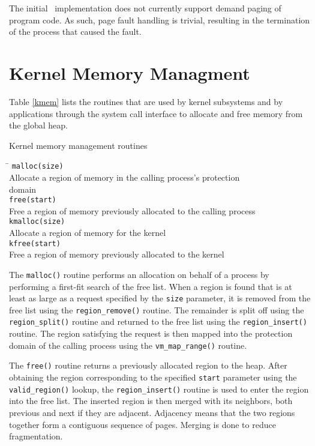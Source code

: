 The initial \roadrunner\  implementation does not
currently support demand paging of program code.  As
such, page fault handling is trivial, resulting in the
termination of the process that caused the fault.


\section{Kernel Memory Managment}

Table \ref{kmem} lists the routines that are used by
kernel subsystems and by applications through the system
call interface to allocate and free memory from the
global heap.

\begin{table}[h]
\caption{\label{kmem} Kernel memory management routines}
\begin{tabbing}
\hspace{0.25in} \= \kill
{\tt malloc(size)} \\
\> Allocate a region of memory in the calling process's protection \\
\> domain \\

{\tt free(start)} \\
\> Free a region of memory previously allocated to the calling process \\

{\tt kmalloc(size)} \\
\> Allocate a region of memory for the kernel \\

{\tt kfree(start)} \\
\> Free a region of memory previously allocated to the kernel \\
\end{tabbing} \end{table}

The {\tt malloc()} routine performs an allocation on behalf
of a process by performing a first-fit search of the free
list.  When a region is found that is at least as large as
a request specified by the {\tt size} parameter, it is
removed from the free list using the {\tt region\_remove()}
routine.  The remainder is split off using the
{\tt region\_split()} routine and returned to the free
list using the {\tt region\_insert()} routine.  The
region satisfying the request is then mapped into the
protection domain of the calling process using the
{\tt vm\_map\_range()} routine.

The {\tt free()} routine returns a previously allocated
region to the heap.  After obtaining the region
corresponding to the specified {\tt start} parameter
using the {\tt valid\_region()} lookup, the
{\tt region\_insert()} routine is used to enter the
region into the free list.  The inserted region is
then merged with its neighbors, both previous and next
if they are adjacent.  Adjacency means that the two
regions together form a contiguous sequence of pages.
Merging is done to reduce fragmentation.


